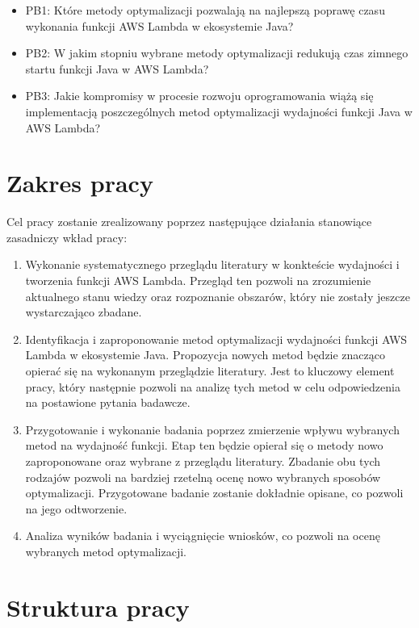 \begin{itemize}
    \item PB1: Które metody optymalizacji pozwalają na najlepszą poprawę czasu wykonania funkcji AWS Lambda w ekosystemie Java?
    \item PB2: W jakim stopniu wybrane metody optymalizacji redukują czas zimnego startu funkcji Java w AWS Lambda?
    \item PB3: Jakie kompromisy w procesie rozwoju oprogramowania wiążą się implementacją poszczególnych metod optymalizacji wydajności funkcji Java w AWS Lambda?
\end{itemize}

\section*{Zakres pracy}\label{chapter:zakres_pracy}

Cel pracy zostanie zrealizowany poprzez następujące działania stanowiące zasadniczy wkład pracy:
\begin{enumerate}
    \item Wykonanie systematycznego przeglądu literatury w konkteście wydajności i tworzenia funkcji AWS Lambda. 
    Przegląd ten pozwoli na zrozumienie aktualnego stanu wiedzy oraz rozpoznanie obszarów, który nie zostały jeszcze wystarczająco zbadane. 
    \item Identyfikacja i zaproponowanie metod optymalizacji wydajności funkcji AWS Lambda w ekosystemie Java. 
    Propozycja nowych metod będzie znacząco opierać się na wykonanym przeglądzie literatury. 
    Jest to kluczowy element pracy, który następnie pozwoli na analizę tych metod w celu odpowiedzenia na postawione pytania badawcze.
    \item Przygotowanie i wykonanie badania poprzez zmierzenie wpływu wybranych metod na wydajność funkcji.
    Etap ten będzie opierał się o metody nowo zaproponowane oraz wybrane z przeglądu literatury.
    Zbadanie obu tych rodzajów pozwoli na bardziej rzetelną ocenę nowo wybranych sposobów optymalizacji.
    Przygotowane badanie zostanie dokładnie opisane, co pozwoli na jego odtworzenie.
    \item Analiza wyników badania i wyciągnięcie wniosków, co pozwoli na ocenę wybranych metod optymalizacji. 
\end{enumerate}

\section*{Struktura pracy}\label{chapter:struktura_pracy}

